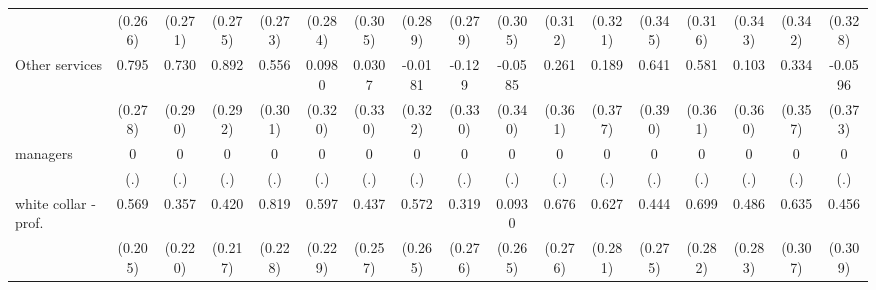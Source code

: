 {\begin{tabular}{l*{16}{c}}
                    &     (0.266)         &     (0.271)         &     (0.275)         &     (0.273)         &     (0.284)         &     (0.305)         &     (0.289)         &     (0.279)         &     (0.305)         &     (0.312)         &     (0.321)         &     (0.345)         &     (0.316)         &     (0.343)         &     (0.342)         &     (0.328)         \\
[1em]
Other services      &       0.795\sym{**} &       0.730\sym{*}  &       0.892\sym{**} &       0.556         &      0.0980         &      0.0307         &     -0.0181         &      -0.129         &     -0.0585         &       0.261         &       0.189         &       0.641         &       0.581         &       0.103         &       0.334         &     -0.0596         \\
                    &     (0.278)         &     (0.290)         &     (0.292)         &     (0.301)         &     (0.320)         &     (0.330)         &     (0.322)         &     (0.330)         &     (0.340)         &     (0.361)         &     (0.377)         &     (0.390)         &     (0.361)         &     (0.360)         &     (0.357)         &     (0.373)         \\
[1em]
managers            &           0         &           0         &           0         &           0         &           0         &           0         &           0         &           0         &           0         &           0         &           0         &           0         &           0         &           0         &           0         &           0         \\
                    &         (.)         &         (.)         &         (.)         &         (.)         &         (.)         &         (.)         &         (.)         &         (.)         &         (.)         &         (.)         &         (.)         &         (.)         &         (.)         &         (.)         &         (.)         &         (.)         \\
[1em]
white collar - prof.&       0.569\sym{**} &       0.357         &       0.420         &       0.819\sym{***}&       0.597\sym{**} &       0.437         &       0.572\sym{*}  &       0.319         &      0.0930         &       0.676\sym{*}  &       0.627\sym{*}  &       0.444         &       0.699\sym{*}  &       0.486         &       0.635\sym{*}  &       0.456         \\
                    &     (0.205)         &     (0.220)         &     (0.217)         &     (0.228)         &     (0.229)         &     (0.257)         &     (0.265)         &     (0.276)         &     (0.265)         &     (0.276)         &     (0.281)         &     (0.275)         &     (0.282)         &     (0.283)         &     (0.307)         &     (0.309)         \\

\end{tabular}}
